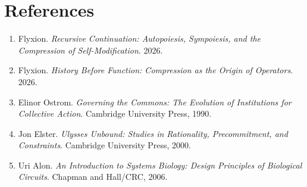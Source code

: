 \documentclass[11pt]{article}
\begin{document}
\section*{References}

\begin{enumerate}
\item Flyxion. \emph{Recursive Continuation: Autopoiesis, Sympoiesis, and the Compression of Self-Modification}. 2026.
\item Flyxion. \emph{History Before Function: Compression as the Origin of Operators}. 2026.
\item Elinor Ostrom. \emph{Governing the Commons: The Evolution of Institutions for Collective Action}. Cambridge University Press, 1990.
\item Jon Elster. \emph{Ulysses Unbound: Studies in Rationality, Precommitment, and Constraints}. Cambridge University Press, 2000.
\item Uri Alon. \emph{An Introduction to Systems Biology: Design Principles of Biological Circuits}. Chapman and Hall/CRC, 2006.
\end{enumerate}
\end{document}
